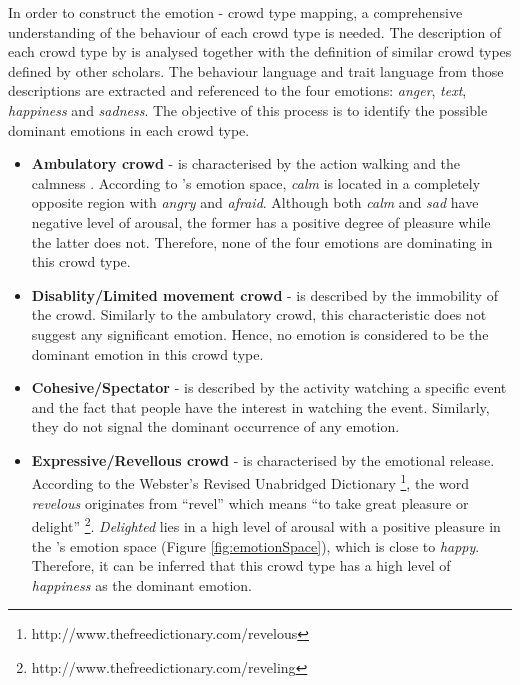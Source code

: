 In order to construct the emotion - crowd type mapping, a comprehensive understanding of the behaviour of each crowd type is needed. The description of each crowd type by \citet{Berlonghi1995} is analysed together with the definition of similar crowd types defined by other scholars. The behaviour language and trait language from those descriptions are extracted and referenced to the four emotions: \textit{anger}, \textit{text}, \textit{happiness} and \textit{sadness}. The objective of this process is to identify the possible dominant emotions in each crowd type. 

\begin{itemize}
\item \textbf{Ambulatory crowd} - is characterised by the action walking and the calmness \citep{Zeitz2009}. According to \citet{russell1980circumplex}'s emotion space, \textit{calm} is located in a completely opposite region with \textit{angry} and \textit{afraid}. Although both \textit{calm} and \textit{sad} have negative level of arousal, the former has a positive degree of pleasure while the latter does not. Therefore, none of the four emotions are dominating in this crowd type.

\item \textbf{Disablity/Limited movement crowd} - is described by the immobility of the crowd. Similarly to the ambulatory crowd, this characteristic does not suggest any significant emotion. Hence, no emotion is considered to be the dominant emotion in this crowd type.

\item \textbf{Cohesive/Spectator} - is described by the activity watching a specific event and the fact that people have the interest in watching the event. Similarly, they do not signal the dominant occurrence of any emotion.

\item \textbf{Expressive/Revellous crowd} - is characterised by the emotional release. According to the Webster's Revised Unabridged Dictionary \footnote{http://www.thefreedictionary.com/revelous}, the word \textit{revelous} originates from ``revel'' which means ``to take great pleasure or delight'' \footnote{http://www.thefreedictionary.com/reveling}. \textit{Delighted} lies in a high level of arousal with a positive pleasure in the \citet{russell1980circumplex}'s emotion space (Figure \ref{fig:emotionSpace}), which is close to \textit{happy}. Therefore, it can be inferred that this crowd type has a high level of \textit{happiness} as the dominant emotion.


\end{itemize}
